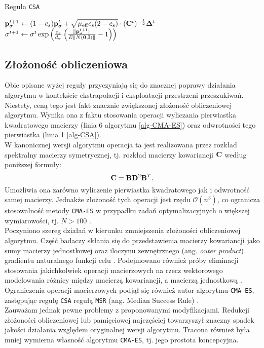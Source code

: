 \begin{algorithm}[h]
\caption{Reguła \texttt{CSA}}
\begin{algorithmic}[1]
   \State ${\bf p}_\sigma^{t+1} \gets (1-c_s){\bf p}_\sigma^t + \sqrt{\mu_\text{eff} c_s(2-c_s)} \cdot ({\bf C}^t)^{-\frac{1}{2}}{\bf \Delta}^t$
   \State $\sigma^{t+1} \gets \sigma^t \exp\left(\frac{c_s}{d_\sigma} \left(\frac{\| {\bf p}_\sigma^{t+1} \|}{E\|N({\bf 0},{\bf I})\|}-1\right)\right) $
\end{algorithmic}
\end{algorithm}
\subsection{Złożoność obliczeniowa}
  Obie opisane wyżej reguły przyczyniają się do znacznej poprawy działania algorytmu w kontekście ekstrapolacji i eksploatacji przestrzeni przeszukiwań. Niestety, ceną tego jest fakt znacznie zwiększonej złożoność obliczeniowej algorytmu. Wynika ona z faktu stosowania operacji wyliczania pierwiastka kwadratowego macierzy (linia 6 algorytmu \ref{alg-CMA-ES}) oraz odwrotności tego pierwiastka (linia 1 \ref{alg-CSA}).\\
  \indent W kanonicznej wersji algorytmu operacja ta jest realizowana przez rozkład spektralny macierzy symetrycznej, tj. rozkład macierzy kowariancji ${\bf C}$ według poniższej formuły:
  \begin{equation}
    {\bf C} = {\bf B}{\bf D}^{2}{\bf B}^{T}.
  \end{equation}
  Umożliwia ona zarówno wyliczenie pierwiastka kwadratowego jak i odwrotność samej macierzy. Jednakże złożoność tych operacji jest rzędu $\mathcal{O}(n^3)$, co ogranicza stosowalność metody \texttt{CMA-ES} w przypadku zadań optymalizacyjnych o większej wymiarowości, tj. $N > 100$ \cite{hansen2006cma}. \\
  \indent Poczyniono szereg działań w kierunku zmniejszenia złożoności obliczeniowej algorytmu. Część badaczy skłania się do przedstawienia macierzy kowariancji jako sumy macierzy jednostkowej oraz iloczynu zewnętrznego (ang. \textit{outer product}) gradientu naturalnego funkcji celu \cite{Poland2001}. Podejmowano również próby eliminacji stosowania jakichkolwiek operacji macierzowych na rzecz wektorowego modelowania różnicy między macierzą kowariancji, a macierzą jednostkową \cite{Loshchilov2017}.
  Ograniczenia operacji macierzowych podjął się również autor algorytmu \texttt{CMA-ES}, zastępując regułę \texttt{CSA} regułą \texttt{MSR} (ang. Median Success Rule) \cite{Elhara13}.\\
 \indent Zauważam jednak pewne problemy z proponowanymi modyfikacjami. Redukcji złożoności obliczeniowej lub pamięciowej najczęściej towarzyszył znaczny spadek jakości działania względem oryginalnej wersji algorytmu. Tracona również była mniej wymierna własność algorytmu \texttt{CMA-ES}, tj. jego prostota koncepcyjna. 


